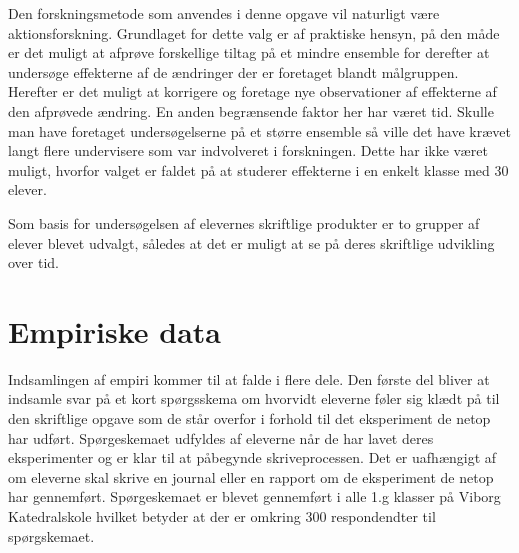 Den forskningsmetode som anvendes i denne opgave vil naturligt være aktionsforskning. Grundlaget for dette valg er af praktiske hensyn, på den måde er det muligt at afprøve forskellige tiltag på et mindre ensemble for derefter at undersøge effekterne af de ændringer der er foretaget blandt målgruppen. Herefter er det muligt at korrigere og foretage nye observationer af effekterne af den afprøvede ændring. En anden begrænsende faktor her har været tid. Skulle man have foretaget undersøgelserne på et større ensemble så ville det have krævet langt flere undervisere som var indvolveret i forskningen. Dette har ikke været muligt, hvorfor valget er faldet på at studerer effekterne i en enkelt klasse med 30 elever.


Som basis for undersøgelsen af elevernes skriftlige produkter er to grupper af elever blevet udvalgt, således at det er muligt at se på deres skriftlige udvikling over tid. 

\section{Empiriske data}
\label{sec:3.2}

Indsamlingen af empiri kommer til at falde i flere dele. Den første del bliver at indsamle svar på et kort spørgsskema om hvorvidt eleverne føler sig klædt på til den skriftlige opgave som de står overfor i forhold til det eksperiment de netop har udført. Spørgeskemaet udfyldes af eleverne når de har lavet deres eksperimenter og er klar til at påbegynde skriveprocessen. Det er uafhængigt af om eleverne skal skrive en journal eller en rapport om de eksperiment de netop har gennemført. 
Spørgeskemaet er blevet gennemført i alle 1.g klasser på Viborg Katedralskole hvilket betyder at der er omkring 300 respondendter til spørgskemaet. 

